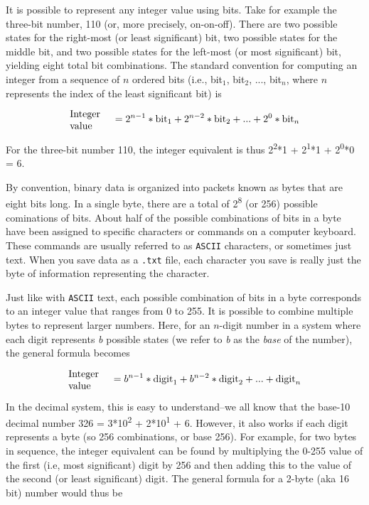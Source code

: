 It is possible to represent any integer value using bits. Take for example the three-bit number, 110 (or, more precisely, on-on-off). There are two possible states for the right-most (or least significant) bit, two possible states for the middle bit, and two possible states for the left-most (or most significant) bit, yielding eight total bit combinations. The standard convention for computing an integer from a sequence of $n$ ordered bits (i.e., bit$_1$, bit$_{2}$, ..., bit$_n$, where $n$ represents the index of the least significant bit) is  

\begin{equation}
\label{eq:base2}
\text{\parbox[c]{1.5cm}{\raggedright Integer value}} = 2^{n-1}*\text{bit}_1 +  2^{n-2}*\text{bit}_{2} + ... + 2^0*\text{bit}_{n}
\end{equation}

For the three-bit number 110, the integer equivalent is thus 2\textsuperscript{2}*1 + 2\textsuperscript{1}*1 + 2\textsuperscript{0}*0 = 6.  

By convention, binary data is organized into packets known as bytes that are eight bits long.  In a single byte, there are a total of 2\textsuperscript{8} (or 256) possible cominations of bits.
About half of the possible combinations of bits in a byte have been assigned to specific characters or commands on a computer keyboard.
These commands are usually referred to as \texttt{ASCII} characters, or sometimes just text.
When you save data as a \texttt{.txt} file, each character you save is really just the byte of information representing the character.

Just like with \texttt{ASCII} text, each possible combination of bits in a byte corresponds to an integer value that ranges from 0 to 255.
It is possible to combine multiple bytes to represent larger numbers.  Here, for an $n$-digit number in a system where each digit represents \emph{b} possible states (we refer to \emph{b} as the \emph{base} of the number), the general formula becomes

\begin{equation}
\label{eq:base}
\text{\parbox[c]{1.5cm}{\raggedright Integer value}} = b^{n-1}*\text{digit}_1 + b^{n-2}*\text{digit}_{2} + ... + \text{digit}_{n} 
\end{equation}

In the decimal system, this is easy to understand--we all know that the base-10 decimal number 326 = 3*10\textsuperscript{2} + 2*10\textsuperscript{1} + 6.
However, it also works if each digit represents a byte (so 256 combinations, or base 256).  
For example, for two bytes in sequence, the integer equivalent can be found by multiplying the 0-255 value of the first (i.e, most significant) digit by 256 and then adding this to the value of the second (or least significant) digit.
The general formula for a 2-byte (aka 16 bit) number would thus be


